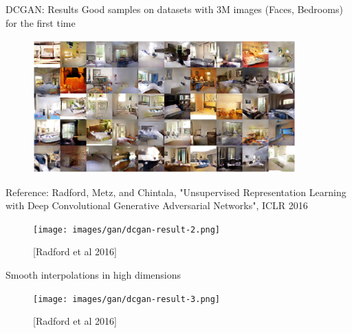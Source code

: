 \begin{frame}[allowframebreaks]{DCGAN: Results}
    Good samples on datasets with 3M images (Faces, Bedrooms) for the first time
    \begin{figure}
        \centering
        \includegraphics[width=0.9\textwidth,keepaspectratio]{images/gan/dcgan-result-1.png}
    \end{figure}
    \footnotesize{Reference: Radford, Metz, and Chintala, "Unsupervised Representation Learning with Deep Convolutional Generative Adversarial Networks", ICLR 2016}

    \framebreak

    \begin{figure}
        \centering
        \texttt{[image: images/gan/dcgan-result-2.png]}
        \caption*{[Radford et al 2016]} 
    \end{figure}

    \framebreak

    Smooth interpolations in high dimensions
    \begin{figure}
        \centering
        \texttt{[image: images/gan/dcgan-result-3.png]}
        \caption*{[Radford et al 2016]}
    \end{figure}

    \framebreak


\end{frame}

